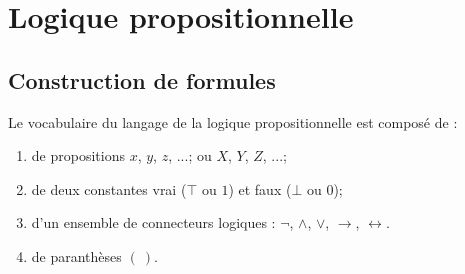 \documentclass[a4paper, 12pt]{extarticle}
\begin{document}


\makemargins %
\makefrontpage
\maketoc


% 


\section{Logique propositionnelle}
\subsection{Construction de formules}
Le vocabulaire du langage de la logique propositionnelle est composé de :
\begin{enumerate}
  \item de propositions $x$, $y$, $z$, ...; ou $X$, $Y$, $Z$, ...;
  \item de deux constantes vrai ($\top$ ou $1$) et faux ($\bot$ ou $0$);
  \item d'un ensemble de connecteurs logiques : $\neg$, $\wedge$, $\vee$, $\rightarrow$, $\leftrightarrow$.
  \item de paranthèses $(\ )$.
\end{enumerate}
\end{document}
